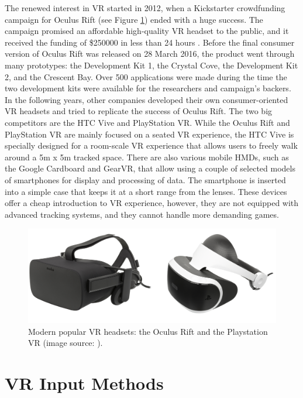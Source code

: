 The renewed interest in VR started in 2012, when a Kickstarter crowdfunding campaign for Oculus Rift (see Figure \ref{fig:CONTROLLERS}) ended with a huge success. The campaign promised an affordable high-quality VR headset to the public, and it received the funding of \$250000 in less than 24 hours \cite{VR_TECHNOLOGY}. Before the final consumer version of Oculus Rift was released on 28 March 2016, the product went through many prototypes: the Development Kit 1, the Crystal Cove, the Development Kit 2, and the Crescent Bay. Over 500 applications were made during the time the two development kits were available for the researchers and campaign's backers. In the following years, other companies developed their own consumer-oriented VR headsets and tried to replicate the success of Oculus Rift. The two big competitors are the HTC Vive and PlayStation VR. While the Oculus Rift and PlayStation VR are mainly focused on a seated VR experience, the HTC Vive is specially designed for a room-scale VR experience that allows users to freely walk around a 5m x 5m tracked space. There are also various mobile HMDs, such as the Google Cardboard and GearVR, that allow using a couple of selected models of smartphones for display and processing of data. The smartphone is inserted into a simple case that keeps it at a short range from the lenses. These devices offer a cheap introduction to VR experience, however, they are not equipped with advanced tracking systems, and they cannot handle more demanding games.

\begin{figure}[th]
\centering
\includegraphics[width=1\textwidth]{img/headsets.png}
\caption{Modern popular VR headsets: the Oculus Rift and the Playstation VR (image source: \cite{OCULUS_HEADSET}\cite{PSVR_HEADSET}).}
\label{fig:CONTROLLERS}
\end{figure}

\section{VR Input Methods}

